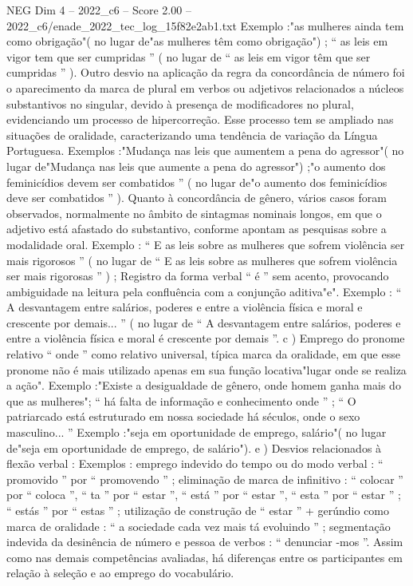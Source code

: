 \begin{textsample}{NEG Dim 4 – 2022\_c6 – Score 2.00 – 2022\_c6/enade\_2022\_tec\_log\_15f82e2ab1.txt}
Exemplo :"as mulheres ainda tem como obrigação"( no lugar de"as mulheres têm como obrigação") ; “ as leis em vigor tem que ser cumpridas ” ( no lugar de “ as leis em vigor têm que ser cumpridas ” ).
Outro desvio na aplicação da regra da concordância de número foi o aparecimento da marca de plural em verbos ou adjetivos relacionados a núcleos substantivos no singular, devido à presença de modificadores no plural, evidenciando um processo de hipercorreção.
Esse processo tem se ampliado nas situações de oralidade, caracterizando uma tendência de variação da Língua Portuguesa.
Exemplos :"Mudança nas leis que aumentem a pena do agressor"( no lugar de"Mudança nas leis que aumente a pena do agressor") ;"o aumento dos feminicídios devem ser combatidos ” ( no lugar de"o aumento dos feminicídios deve ser combatidos ” ).
Quanto à concordância de gênero, vários casos foram observados, normalmente no âmbito de sintagmas nominais longos, em que o adjetivo está afastado do substantivo, conforme apontam as pesquisas sobre a modalidade oral.
Exemplo : “ E as leis sobre as mulheres que sofrem violência ser mais rigorosos ” ( no lugar de “ E as leis sobre as mulheres que sofrem violência ser mais rigorosas ” ) ; Registro da forma verbal “ é ” sem acento, provocando ambiguidade na leitura pela confluência com a conjunção aditiva"e".
Exemplo : “ A desvantagem entre salários, poderes e entre a violência física e moral e crescente por demais... ” ( no lugar de “ A desvantagem entre salários, poderes e entre a violência física e moral é crescente por demais ”. c ) Emprego do pronome relativo “ onde ” como relativo universal, típica marca da oralidade, em que esse pronome não é mais utilizado apenas em sua função locativa"lugar onde se realiza a ação".
Exemplo :"Existe a desigualdade de gênero, onde homem ganha mais do que as mulheres"; “ há falta de informação e conhecimento onde ” ; “ O patriarcado está estruturado em nossa sociedade há séculos, onde o sexo masculino... ” Exemplo :"seja em oportunidade de emprego, salário"( no lugar de"seja em oportunidade de emprego, de salário"). e ) Desvios relacionados à flexão verbal : Exemplos : emprego indevido do tempo ou do modo verbal : “ promovido ” por “ promovendo ” ; eliminação de marca de infinitivo : “ colocar ” por “ coloca ”, “ ta ” por “ estar ”, “ está ” por “ estar ”, “ esta ” por “ estar ” ; “ estás ” por “ estas ” ; utilização de construção de “ estar ” + gerúndio como marca de oralidade : “ a sociedade cada vez mais tá evoluindo ” ; segmentação indevida da desinência de número e pessoa de verbos : “ denunciar -mos ”.
Assim como nas demais competências avaliadas, há diferenças entre os participantes em relação à seleção e ao emprego do vocabulário.

\end{textsample}

